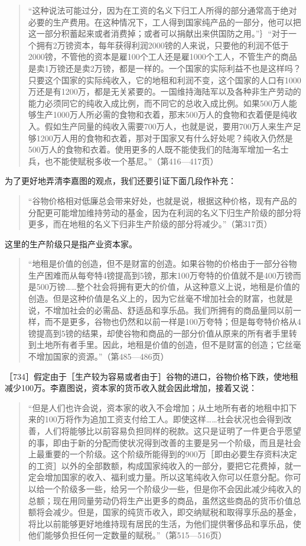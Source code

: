 \begin{quote}{“这种说法可能过分，因为在工资的名义下归工人所得的部分通常高于绝对必要的生产费用。在这种情况下，工人得到国家纯产品的一部分，他可以把这一部分积蓄起来或者消费掉；或者可以捐献出来供国防之用。”｝“对于一个拥有2万镑资本，每年获得利润2000镑的人来说，只要他的利润不低于2000镑，不管他的资本是雇100个工人还是雇1000个工人，不管生产的商品是卖1万镑还是卖2万镑，都是一样的。一个国家的实际利益不也是这样吗？只要这个国家的实际纯收入，它的地租和利润不变，这个国家的人口有1000万还是有1200万，都是无关紧要的。一国维持海陆军以及各种非生产劳动的能力必须同它的纯收入成比例，而不同它的总收入成比例。如果500万人能够生产1000万人所必需的食物和衣着，那末500万人的食物和衣着便是纯收入。假如生产同量的纯收入需要700万人，也就是说，要用700万人来生产足够1200万人用的食物和衣着，那对于国家又有什么好处呢？纯收入仍然是500万人的食物和衣着。使用更多的人既不能使我们的陆海军增加一名士兵，也不能使赋税多收一个基尼。”（第416—417页）}\end{quote}

为了更好地弄清李嘉图的观点，我们还要引证下面几段作补充：

\begin{quote}{“谷物价格相对低廉总会带来好处，也就是说，根据这种价格，现有产品的分配更可能增加维持劳动的基金，因为在利润的名义下归生产阶级的部分将更多，而在地租的名义下归非生产阶级的部分将减少。”（第317页）}\end{quote}

这里的生产阶级只是指产业资本家。

\begin{quote}{“地租是价值的创造，但不是财富的创造。如果谷物的价格由于一部分谷物生产困难而从每夸特4镑提高到5镑，那末100万夸特的价值就不是400万镑而是500万镑……整个社会将拥有更大的价值，从这种意义上说，地租是价值的创造。但是这种价值是名义上的，因为它丝毫不增加社会的财富，也就是说，不增加社会的必需品、舒适品和享乐品。我们所拥有的商品量同以前一样，而不是更多，谷物也仍然和以前一样是100万夸特；但是每夸特价格从4镑提高到5镑的结果，却使谷物和商品的一部分价值从原来的所有者手里转到土地所有者手里。因此，地租是价值的创造，但不是财富的创造；它丝毫不增加国家的资源。”（第485—486页）}\end{quote}

［734］假定由于［生产较为容易或者由于］谷物的进口，谷物价格下跌，使地租减少100万。李嘉图说，资本家的货币收入就会因此增加，接着又说：

\begin{quote}{“但是人们也许会说，资本家的收入不会增加；从土地所有者的地租中扣下来的100万将作为追加工资支付给工人。即使这样……社会状况也会得到改善，人们将能够比以前容易负担同样的税款。这只是证明了一件更合乎愿望的事，即由于新的分配而使状况得到改善的主要是另一个阶级，而且是社会上最重要的一个阶级。这个阶级所能得到的900万［即由必要生存资料决定的工资］以外的全部数额，构成国家纯收入的一部分，要把它花费掉，就一定会增加国家的收入、福利或力量。所以这笔纯收入你可以任意分配。你可以给一个阶级多一些，给另一个阶级少一些，但是你不会因此减少纯收入的总额；现在用同量劳动仍将生产出更多的商品，虽然这些商品的货币价值总额将会减少。但是，国家的纯货币收入，即交纳赋税和取得享乐品的基金，将比以前能够更好地维持现有居民的生活，为他们提供奢侈品和享乐品，使他们能够负担任何一定数量的赋税。”（第515—516页）}\end{quote}

